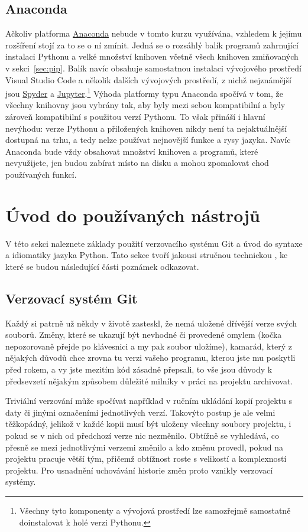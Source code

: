 \documentclass[a4paper,11pt,twoside]{article}
\theoremstyle{red}
\theoremstyle{green}
\begin{document}
\subsection{Anaconda}
    Ačkoliv platforma \href{https://www.anaconda.com/}{Anaconda} nebude v tomto kurzu využívána, vzhledem k jejímu rozšíření stojí za to se o ní zmínit.
    Jedná se o rozsáhlý balík programů zahrnující instalaci Pythonu a velké množství knihoven včetně všech knihoven zmiňovaných v sekci~\ref{sec:pip}.
    Balík navíc obsahuje samostatnou instalaci vývojového prostředí Visual Studio Code a několik dalších vývojových prostředí, z nichž nejznámější jsou \href{https://www.spyder-ide.org/}{Spyder} a \href{https://jupyter.org/}{Jupyter}.\footnote{
        Všechny tyto komponenty a vývojová prostředí lze samozřejmě samostatně doinstalovat k holé verzi Pythonu.}
    Výhoda platformy typu Anaconda spočívá v tom, že všechny knihovny jsou vybrány tak, aby byly mezi sebou kompatibilní a byly zároveň kompatibilní s použitou verzí Pythonu.
    To však přináší i hlavní nevýhodu: verze Pythonu a přiložených knihoven nikdy není ta nejaktuálnější dostupná na trhu, a tedy nelze používat nejnovější funkce a rysy jazyka.
    Navíc Anaconda bude vždy obsahovat množství knihoven a programů, které nevyužijete, jen budou zabírat místo na disku a mohou zpomalovat chod používaných funkcí.


\section{Úvod do používaných nástrojů}
    V této sekci naleznete základy použití verzovacího systému Git a úvod do syntaxe a idiomatiky jazyka Python.
    Tato sekce tvoří jakousi stručnou technickou , ke které se budou následující části poznámek odkazovat.

\subsection{Verzovací systém Git}
    Každý si patrně už někdy v životě zasteskl, že nemá uložené dřívější verze svých souborů.
    Změny, které se ukazují být nevhodné či provedené omylem (kočka nepozorovaně přejde po klávesnici a my pak soubor uložíme), kamarád, který z nějakých důvodů chce zrovna tu verzi vašeho programu, kterou jste mu poskytli před rokem, a vy jste mezitím kód zásadně přepsali, to vše jsou důvody k předsevzetí nějakým způsobem důležité milníky v práci na projektu archivovat.

    Triviální verzování může spočívat například v ručním ukládání kopií projektu s daty či jinými označeními jednotlivých verzí.
    Takovýto postup je ale velmi těžkopádný, jelikož v každé kopii musí být uloženy všechny soubory projektu, i pokud se v nich od předchozí verze nic nezměnilo.
    Obtížně se vyhledává, co přesně se mezi jednotlivými verzemi změnilo a kdo změnu provedl, pokud na projektu pracuje větší tým, přičemž obtížnost roste s velikostí a komplexností projektu.
    Pro usnadnění uchovávání historie změn proto vznikly verzovací systémy.    
\end{document}
